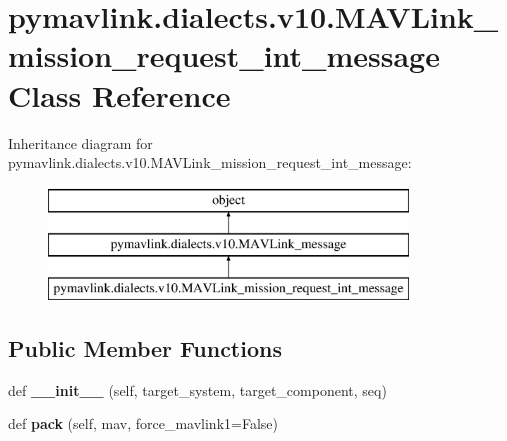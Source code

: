 \hypertarget{classpymavlink_1_1dialects_1_1v10_1_1MAVLink__mission__request__int__message}{}\section{pymavlink.\+dialects.\+v10.\+M\+A\+V\+Link\+\_\+mission\+\_\+request\+\_\+int\+\_\+message Class Reference}
\label{classpymavlink_1_1dialects_1_1v10_1_1MAVLink__mission__request__int__message}
Inheritance diagram for pymavlink.\+dialects.\+v10.\+M\+A\+V\+Link\+\_\+mission\+\_\+request\+\_\+int\+\_\+message\+:\begin{figure}[H]
\begin{center}
\leavevmode
\includegraphics[height=3.000000cm]{classpymavlink_1_1dialects_1_1v10_1_1MAVLink__mission__request__int__message}
\end{center}
\end{figure}
\subsection*{Public Member Functions}
\begin{DoxyCompactItemize}
\item 
\mbox{\label{classpymavlink_1_1dialects_1_1v10_1_1MAVLink__mission__request__int__message_a436bde89a194f60fb5123941b83d5ee7}} 
def {\bfseries \+\_\+\+\_\+init\+\_\+\+\_\+} (self, target\+\_\+system, target\+\_\+component, seq)
\item 
\mbox{\label{classpymavlink_1_1dialects_1_1v10_1_1MAVLink__mission__request__int__message_a8f4ed68d310efe5bf1f2757fdcb3464d}} 
def {\bfseries pack} (self, mav, force\+\_\+mavlink1=False)
\end{DoxyCompactItemize}
